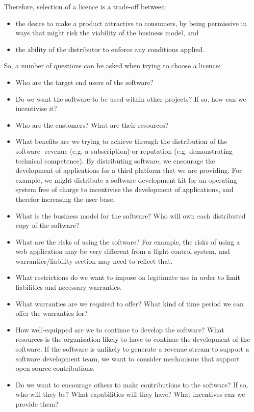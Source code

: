 \documentclass[a4paper, openany]{memoir}
\begin{document}
Therefore, selection of a licence is a trade-off between:
\begin{itemize}
    \item the desire to make a product attractive to consumers, by being permissive in ways that might risk the viability of the business model, and
    \item the ability of the distributor to enforce any conditions applied.
\end{itemize}

So, a number of questions can be asked when trying to choose a licence:
\begin{itemize}
    \item Who are the target end users of the software?
    \item Do we want the software to be used within other projects? If so, how can we incentivise it?
    \item Who are the customers? What are their resources?
    \item What benefits are we trying to achieve through the distribution of the software- revenue (e.g. a subscription) or reputation (e.g. demonstrating technical competence). By distributing software, we encourage the development of applications for a third platform that we are providing. For example, we might distribute a software development kit for an operating system free of charge to incentivise the development of applications, and therefor increasing the user base.
    \item What is the business model for the software? Who will own each distributed copy of the software?
    \item What are the risks of using the software? For example, the risks of using a web application may be very different from a flight control system, and warranties/liability section may need to reflect that.
    \item What restrictions do we want to impose on legitimate use in order to limit liabilities and necessary warranties.
    \item What warranties are we required to offer? What kind of time period we can offer the warranties for?
    \item How well-equipped are we to continue to develop the software? What resources is the organisation likely to have to continue the development of the software. If the software is unlikely to generate a revenue stream to support a software development team, we want to consider mechanisms that support open source contributions.
    \item Do we want to encourage others to make contributions to the software? If so, who will they be? What capabilities will they have? What incentives can we provide them?

\end{itemize}
\end{document}
